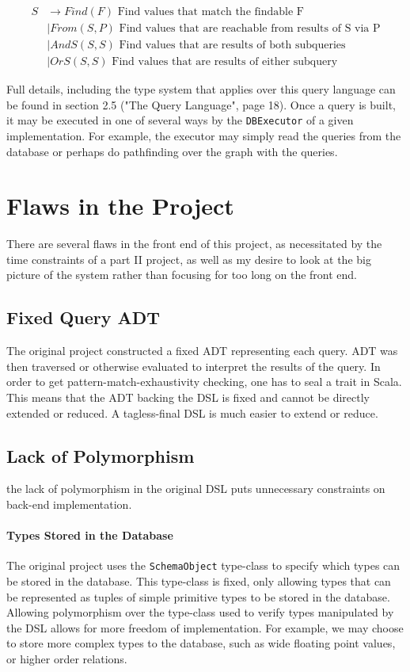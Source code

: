 \documentclass{report}
\newcommand \2[0]{\textbf{2}}
\newcommand \3[0]{\textbf{3}}
\begin{document}
    \begin{equation}
        \label{SDefinition}
        \begin{split}
        S & \rightarrow Find(F) \mbox{ Find values that match the findable F}\\
        &\mid From(S, P) \mbox{ Find values that are reachable from results of S via P}\\
        &\mid AndS(S, S) \mbox{ Find values that are results of both subqueries}\\
        &\mid OrS(S, S) \mbox{ Find values that are results of either subquery}
        \end{split}
    \end{equation} 

Full details, including the type system that applies over this query language can be found in section 2.5 ("The Query Language", page 18). Once a query is built, it may be executed in one of several ways by the \texttt{DBExecutor} of a given implementation. For example, the executor may simply read the queries from the database or perhaps do pathfinding over the graph with the queries.
\section{Flaws in the Project}
There are several flaws in the front end of this project, as necessitated by the time constraints of a part II project, as well as my desire to look at the big picture of the system rather than focusing for too long on the front end.
\subsection{Fixed Query ADT}
The original project constructed a fixed ADT representing each query. ADT was then traversed or otherwise evaluated to interpret the results of the query. In order to get pattern-match-exhaustivity checking, one has to seal a trait in Scala. This means that the ADT backing the DSL is fixed and cannot be directly extended or reduced. A tagless-final DSL is much easier to extend or reduce.

\subsection{Lack of Polymorphism}
the lack of polymorphism in the original DSL puts unnecessary constraints on back-end implementation.
\paragraph{Types Stored in the Database}
The original project uses the \texttt{SchemaObject} type-class to specify which types can be stored in the database. This type-class is fixed, only allowing types that can be represented as tuples of simple primitive types to be stored in the database. Allowing polymorphism over the type-class used to verify types manipulated by the DSL allows for more freedom of implementation. For example, we may choose to store more complex types to the database, such as wide floating point values, or higher order relations.
\end{document}
